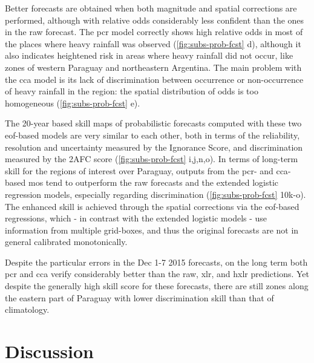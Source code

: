 \documentclass[twocol]{ametsoc}
\begin{document}
Better forecasts are obtained when both magnitude and spatial corrections are performed, although with relative odds considerably less confident than the ones in the raw forecast.
The \gls{pcr} model correctly shows high relative odds in most of the places where heavy rainfall was observed (\cref{fig:subs-prob-fcst} d), although it also indicates heightened risk in areas where heavy rainfall did not occur, like zones of western Paraguay and northeastern Argentina.
The main problem with the \gls{cca} model is its lack of discrimination between occurrence or non-occurrence of heavy rainfall in the region: the spatial distribution of odds is too homogeneous (\cref{fig:subs-prob-fcst} e).

The 20-year based skill maps of probabilistic forecasts computed with these two \gls{eof}-based models are very similar to each other, both in terms of the reliability, resolution and uncertainty measured by the Ignorance Score, and discrimination measured by the 2AFC score (\cref{fig:subs-prob-fcst} i,j,n,o).
In terms of long-term skill for the regions of interest over Paraguay, outputs from the \gls{pcr}- and \gls{cca}-based \gls{mos} tend to outperform the raw forecasts and the extended logistic regression models, especially regarding discrimination (\cref{fig:subs-prob-fcst} 10k-o).
The enhanced skill is achieved through the spatial corrections via the \gls{eof}-based regressions, which - in contrast with the extended logistic models - use information from multiple grid-boxes, and thus the original forecasts are not in general calibrated monotonically.

Despite the particular errors in the Dec 1-7 2015 forecasts, on the long term both \gls{pcr} and \gls{cca} verify considerably better than the raw, \gls{xlr}, and \gls{hxlr} predictions.
Yet despite the generally high skill score for these forecasts, there are still zones along the eastern part of Paraguay with lower discrimination skill than that of climatology.


\section{Discussion}
\label{sec:discussion}
\end{document}
